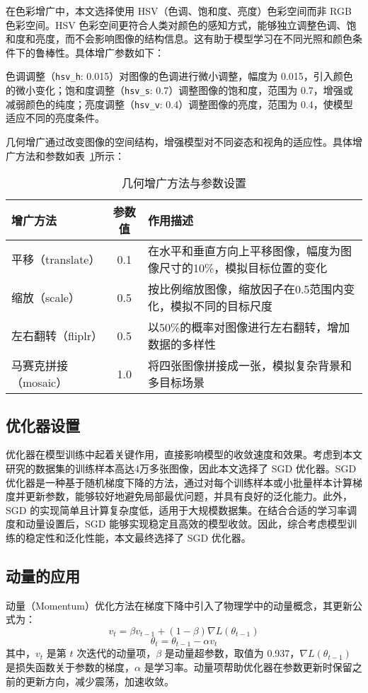 在色彩增广中，本文选择使用 HSV（色调、饱和度、亮度）色彩空间而非 RGB 色彩空间。HSV 色彩空间更符合人类对颜色的感知方式，能够独立调整色调、饱和度和亮度，而不会影响图像的结构信息。这有助于模型学习在不同光照和颜色条件下的鲁棒性。具体增广参数如下：

色调调整（\texttt{hsv\_h}: 0.015）对图像的色调进行微小调整，幅度为 0.015，引入颜色的微小变化；饱和度调整（\texttt{hsv\_s}: 0.7）调整图像的饱和度，范围为 0.7，增强或减弱颜色的纯度；亮度调整（\texttt{hsv\_v}: 0.4）调整图像的亮度，范围为 0.4，使模型适应不同的亮度条件。

几何增广通过改变图像的空间结构，增强模型对不同姿态和视角的适应性。具体增广方法和参数如表~\ref{tab:geometric_augmentation}所示：

\begin{table}[htbp]
	\centering
	\caption{几何增广方法与参数设置}
	\label{tab:geometric_augmentation}
	\begin{tabular}{lcp{8cm}}
		\toprule
		增广方法 & 参数值 & 作用描述 \\
		\midrule
		平移（translate） & 0.1 & 在水平和垂直方向上平移图像，幅度为图像尺寸的10\%，模拟目标位置的变化 \\
		缩放（scale） & 0.5 & 按比例缩放图像，缩放因子在0.5范围内变化，模拟不同的目标尺度 \\
		左右翻转（fliplr） & 0.5 & 以50\%的概率对图像进行左右翻转，增加数据的多样性 \\
		马赛克拼接（mosaic） & 1.0 & 将四张图像拼接成一张，模拟复杂背景和多目标场景 \\
		\bottomrule
	\end{tabular}
\end{table}
\subsection{优化器设置}
优化器在模型训练中起着关键作用，直接影响模型的收敛速度和效果。考虑到本文研究的数据集的训练样本高达4万多张图像，因此本文选择了 SGD 优化器。SGD 优化器是一种基于随机梯度下降的方法，通过对每个训练样本或小批量样本计算梯度并更新参数，能够较好地避免局部最优问题，并具有良好的泛化能力。此外，SGD 的实现简单且计算复杂度低，适用于大规模数据集。在结合合适的学习率调度和动量设置后，SGD 能够实现稳定且高效的模型收敛。因此，综合考虑模型训练的稳定性和泛化性能，本文最终选择了 SGD 优化器。 

\subsection{动量的应用}
动量（Momentum）优化方法在梯度下降中引入了物理学中的动量概念，其更新公式为：
\begin{equation}
	v_t = \beta v_{t-1} + (1 - \beta) \nabla L(\theta_{t-1})
\end{equation}
\begin{equation}
	\theta_t = \theta_{t-1} - \alpha v_t
\end{equation}
其中，$v_t$ 是第 $t$ 次迭代的动量项，$\beta$ 是动量超参数，取值为 0.937，$\nabla L(\theta_{t-1})$ 是损失函数关于参数的梯度，$\alpha$ 是学习率。动量项帮助优化器在参数更新时保留之前的更新方向，减少震荡，加速收敛。

